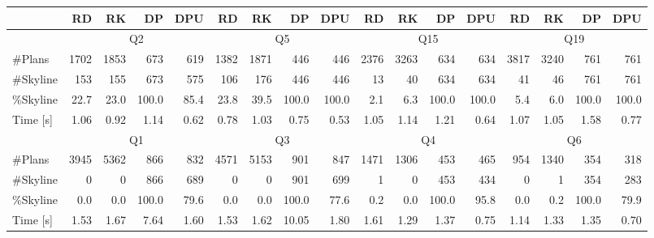 \begin{table}[htb]
  \centering
  \begin{tabular}{l|r|r|r|r|r|r|r|r|r|r|r|r|r|r|r|r}
 & RD & RK & DP & DPU & RD & RK & DP & DPU & RD & RK & DP & DPU & RD & RK & DP & DPU \\
    \hline               
                                                                                                               
 & \multicolumn{4}{c}{Q2} & \multicolumn{4}{|c|}{Q5} & \multicolumn{4}{c}{Q15} & \multicolumn{4}{|c}{Q19}  \\

    \hline                                                                                                   

    \#Plans   & 1702 & 1853 & 673   & 619  & 1382 & 1871 & 446   & 446   & 2376 & 3263 & 634   & 634   & 3817 & 3240 & 761   & 761   \\
    \#Skyline & 153  & 155  & 673   & 575  & 106  & 176  & 446   & 446   & 13   & 40   & 634   & 634   & 41   & 46   & 761   & 761   \\ 
    \%Skyline & 22.7 & 23.0 & 100.0 & 85.4 & 23.8 & 39.5 & 100.0 & 100.0 & 2.1  & 6.3  & 100.0 & 100.0 & 5.4  & 6.0  & 100.0 & 100.0 \\
    Time [s]  & 1.06 & 0.92 & 1.14  & 0.62 & 0.78 & 1.03 & 0.75  & 0.53  & 1.05 & 1.14 & 1.21  & 0.64  & 1.07 & 1.05 & 1.58  & 0.77  \\
  
    \hline
    \hline

 & \multicolumn{4}{c}{Q1} & \multicolumn{4}{|c|}{Q3} & \multicolumn{4}{c|}{Q4} & \multicolumn{4}{c}{Q6} \\

    \hline

    \#Plans   & 3945 & 5362 & 866   & 832  & 4571 & 5153 & 901   & 847  & 1471 & 1306 & 453   & 465  & 954  & 1340 & 354   & 318  \\
    \#Skyline & 0    & 0    & 866   & 689  & 0    & 0    & 901   & 699  & 1    & 0    & 453   & 434  & 0    & 1    & 354   & 283  \\ 
    \%Skyline & 0.0  & 0.0  & 100.0 & 79.6 & 0.0  & 0.0  & 100.0 & 77.6 & 0.2  & 0.0  & 100.0 & 95.8 & 0.0  & 0.2  & 100.0 & 79.9 \\
    Time [s]  & 1.53 & 1.67 & 7.64  & 1.60 & 1.53 & 1.62 & 10.05 & 1.80 & 1.61 & 1.29 & 1.37  & 0.75 & 1.14 & 1.33 & 1.35  & 0.70 \\

    \hline
    \hline


\end{tabular}
\end{table}
